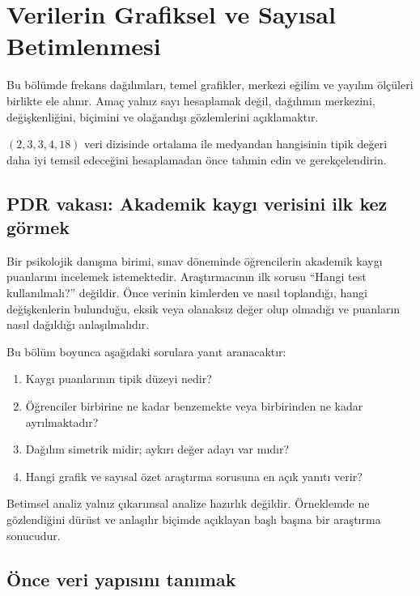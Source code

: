 \chapter{Verilerin Grafiksel ve Sayısal Betimlenmesi}
\label{ch:descriptive}

\begin{hedefler}
Bu bölümde frekans dağılımları, temel grafikler, merkezi eğilim ve yayılım
ölçüleri birlikte ele alınır. Amaç yalnız sayı hesaplamak değil, dağılımın
merkezini, değişkenliğini, biçimini ve olağandışı gözlemlerini açıklamaktır.
\end{hedefler}

\begin{hazirlik}
$(2,3,3,4,18)$ veri dizisinde ortalama ile medyandan hangisinin tipik değeri
daha iyi temsil edeceğini hesaplamadan önce tahmin edin ve gerekçelendirin.
\end{hazirlik}

\section{PDR vakası: Akademik kaygı verisini ilk kez görmek}

Bir psikolojik danışma birimi, sınav döneminde öğrencilerin akademik kaygı
puanlarını incelemek istemektedir. Araştırmacının ilk sorusu ``Hangi test
kullanılmalı?'' değildir. Önce verinin kimlerden ve nasıl toplandığı, hangi
değişkenlerin bulunduğu, eksik veya olanaksız değer olup olmadığı ve puanların
nasıl dağıldığı anlaşılmalıdır.

Bu bölüm boyunca aşağıdaki sorulara yanıt aranacaktır:

\begin{enumerate}
  \item Kaygı puanlarının tipik düzeyi nedir?
  \item Öğrenciler birbirine ne kadar benzemekte veya birbirinden ne kadar ayrılmaktadır?
  \item Dağılım simetrik midir; aykırı değer adayı var mıdır?
  \item Hangi grafik ve sayısal özet araştırma sorusuna en açık yanıtı verir?
\end{enumerate}


Betimsel analiz yalnız çıkarımsal analize hazırlık değildir. Örneklemde ne
gözlendiğini dürüst ve anlaşılır biçimde açıklayan başlı başına bir araştırma
sonucudur.

\section{Önce veri yapısını tanımak}


